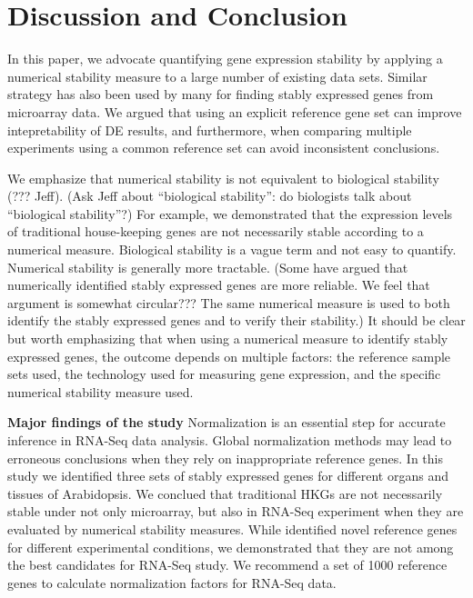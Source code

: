 \documentclass[letterpaper,12pt]{article}
\begin{document}
  \section{Discussion and Conclusion}\label{section:discussion}
In this paper, we advocate quantifying gene expression stability by applying a
numerical stability measure to a large number of existing data sets.  Similar
strategy has also been used by many for finding stably expressed genes from
microarray data. We argued that using an explicit reference gene set can
improve intepretability of DE results, and furthermore, when comparing
multiple experiments using a common reference set can avoid inconsistent
conclusions.

We emphasize that numerical stability is not equivalent to biological
stability (??? Jeff).  (Ask Jeff about  ``biological stability'': do
biologists talk about ``biological stability''?) For example, we demonstrated
that the expression levels of traditional house-keeping genes are not
necessarily stable according to a numerical measure. 
Biological stability is a vague term and not easy to quantify.  Numerical
stability is generally more tractable. (Some have argued that numerically
identified stably expressed genes are more reliable. We feel that argument is
somewhat circular??? The same numerical measure is used to both identify the
stably expressed genes and to verify their stability.) 
It should be clear but worth emphasizing that when using a numerical measure
to identify stably expressed genes, the outcome depends on multiple factors: the
reference sample sets used, the technology used for measuring gene expression,
and the specific numerical stability measure used.


%

  \textbf{Major findings of the study}
  Normalization is an essential step for accurate inference in RNA-Seq data analysis. Global normalization methods may lead to erroneous conclusions when they rely on inappropriate reference genes. In this study we identified three sets of stably expressed genes for different organs and tissues of Arabidopsis. We conclued that traditional HKGs are not necessarily stable under not only microarray, but also in RNA-Seq experiment when they are evaluated by numerical stability measures. While \cite{czechowski2005genome} identified novel reference genes for different experimental conditions, we demonstrated that they are not among the best candidates for RNA-Seq study. We recommend a set of 1000 reference genes to calculate normalization factors for RNA-Seq data.  
   
\end{document}

